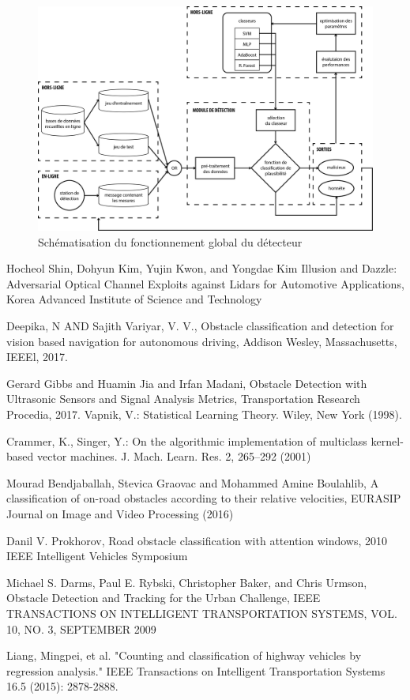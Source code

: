 \documentclass[a4paper]{report}
\begin{document}
\begin{figure}
\centering
\includegraphics[width=\textwidth]{img/structure.png}
\caption{Schématisation du fonctionnement global du détecteur}
\end{figure}


\begin{thebibliography}{9}
Hocheol Shin, Dohyun Kim, Yujin Kwon, and Yongdae Kim
Illusion and Dazzle: Adversarial Optical Channel Exploits against Lidars for Automotive Applications, Korea Advanced Institute of Science and Technology 

          Deepika, N AND Sajith Variyar, V. V.,
          Obstacle classification and detection for vision based navigation for autonomous driving,
          Addison Wesley, Massachusetts,
          IEEEl,
          2017.
     
         
          Gerard Gibbs and Huamin Jia and Irfan Madani,
          Obstacle Detection with Ultrasonic Sensors and Signal Analysis Metrics,
          Transportation Research Procedia,
          2017.
		Vapnik, V.: Statistical Learning Theory. Wiley, New York (1998).

Crammer, K., Singer, Y.: On the algorithmic implementation of multiclass kernel-based vector machines. J. Mach. Learn. Res. 2, 265–292 (2001)

Mourad Bendjaballah, Stevica Graovac and Mohammed Amine Boulahlib, A classification of on-road obstacles according to their relative velocities, EURASIP Journal on Image and Video Processing (2016) 

Danil V. Prokhorov, Road obstacle classification with attention windows, 2010 IEEE Intelligent Vehicles Symposium

Michael S. Darms, Paul E. Rybski, Christopher Baker, and Chris Urmson, Obstacle Detection and Tracking for the Urban Challenge, IEEE TRANSACTIONS ON INTELLIGENT TRANSPORTATION SYSTEMS, VOL. 10, NO. 3, SEPTEMBER 2009

Liang, Mingpei, et al. "Counting and classification of highway vehicles by regression analysis." IEEE Transactions on Intelligent Transportation Systems 16.5 (2015): 2878-2888.

\end{thebibliography}

\listoffigures
\begingroup
\let\clearpage\relax
\listoftables
\endgroup
\end{document}
